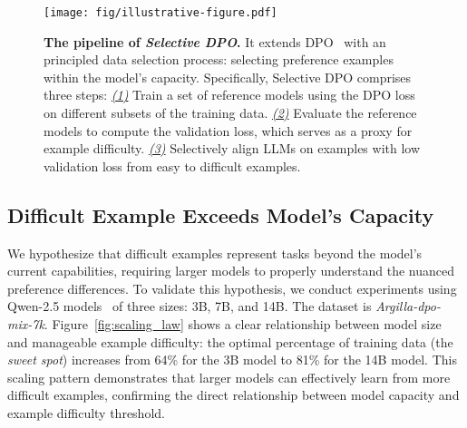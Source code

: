 \begin{figure*}
    \centering
    \texttt{[image: fig/illustrative-figure.pdf]}
    \vspace{-0.9cm}
    \caption{
    \textbf{The pipeline of \textit{Selective DPO}.} It extends DPO~\cite{rafailov2024direct} with an principled data selection process: selecting preference examples within the model's capacity. Specifically, Selective DPO comprises three steps: \underline{\textit{(1)}} Train a set of reference models using the DPO loss on different subsets of the training data. \underline{\textit{(2)}} Evaluate the reference models to compute the validation loss, which serves as a proxy for example difficulty. \underline{\textit{(3)}} Selectively align LLMs on examples with low validation loss from easy to difficult examples.
    }
    \vspace{-0.4cm}
    \label{fig:illustrative-figure}
\end{figure*}


\subsection{Difficult Example Exceeds Model's Capacity}
We hypothesize that difficult examples represent tasks beyond the model's current capabilities, requiring larger models to properly understand the nuanced preference differences.
To validate this hypothesis, we conduct experiments using Qwen-2.5 models~\cite{qwen2.5} of three sizes: 3B, 7B, and 14B. The dataset is \textit{Argilla-dpo-mix-7k}. 
Figure~\ref{fig:scaling_law} shows a clear relationship between model size and manageable example difficulty: the optimal percentage of training data (the \textit{sweet spot}) increases from 64\% for the 3B model to 81\% for the 14B model. This scaling pattern demonstrates that larger models can effectively learn from more difficult examples, confirming the direct relationship between model capacity and example difficulty threshold.

